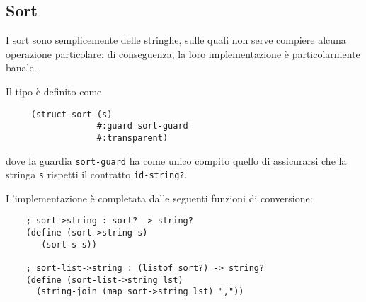 \subsection{Sort}

I sort sono semplicemente delle stringhe, sulle quali non serve compiere
alcuna operazione particolare: di conseguenza, la loro implementazione
\`e particolarmente banale.

Il tipo \`e definito come

\begin{lstlisting}
     (struct sort (s)
                  #:guard sort-guard
                  #:transparent)
\end{lstlisting}

dove la guardia \lstinline{sort-guard} ha come unico compito quello di
assicurarsi che la stringa \lstinline{s} rispetti il contratto
\lstinline{id-string?}.

L'implementazione \`e completata dalle seguenti funzioni di conversione:

\begin{lstlisting}
    ; sort->string : sort? -> string?
    (define (sort->string s)
       (sort-s s))

    ; sort-list->string : (listof sort?) -> string?
    (define (sort-list->string lst)
      (string-join (map sort->string lst) ","))
\end{lstlisting}
